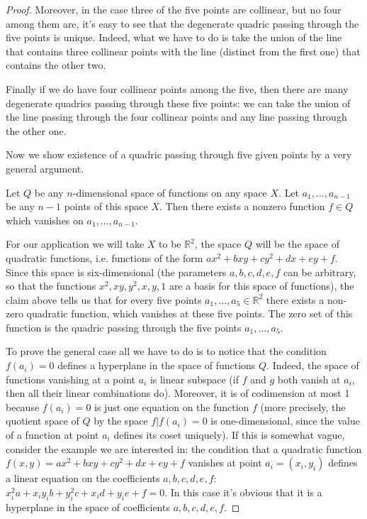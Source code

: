 {{\begin{proof}
Moreover, in the case three of the five points are collinear, but no four among them are, it's easy to see that the degenerate quadric passing through the five points is unique. Indeed, what we have to do is take the union of the line that contains three collinear points with the line (distinct from the first one) that contains the other two.

Finally if we do have four collinear points among the five, then there are many degenerate quadrics passing through these five points: we can take the union of the line passing through the four collinear points and any line passing through the other one.

Now we show existence of a quadric passing through five given points by a very general argument.

Let $Q$ be any $n$-dimensional space of functions on any space $X$. Let $a_1,\ldots,a_{n-1}$ be any $n-1$ points of this space $X$. Then there exists a nonzero function $f\in Q$ which vanishes on $a_1,\ldots,a_{n-1}$.

For our application we will take $X$ to be $\mathbb{R}^2$, the space $Q$ will be the space of quadratic functions, i.e. functions of the form $a x^2+b xy + cy^2+dx+ey+f$. Since this space is six-dimensional (the parameters $a,b,c,d,e,f$ can be arbitrary, so that the functions $x^2,xy,y^2,x,y,1$ are a basis for this space of functions), the claim above tells us that for every five points $a_1,\ldots,a_5\in \mathbb{R}^2$ there exists a non-zero quadratic function, which vanishes at these five points. The zero set of this function is the quadric passing through the five points $a_1,\ldots,a_5$.

To prove the general case all we have to do is to notice that the condition $f(a_i)=0$ defines a hyperplane in the space of functions $Q$. Indeed, the space of functions vanishing at a point $a_i$ is linear subspace (if $f$ and $g$ both vanish at $a_i$, then all their linear combinations do). Moreover, it is of codimension at most 1 because $f(a_i)=0$ is just one equation on the function $f$ (more precisely, the quotient space of $Q$ by the space $f| f(a_i)=0$ is one-dimensional, since the value of a function at point $a_i$ defines its coset uniquely). If this is somewhat vague, consider the example we are interested in: the condition that a quadratic function $f(x,y)=ax^2+bxy+cy^2+dx+ey+f$ vanishes at point $a_i=(x_i,y_i)$ defines a linear equation on the coefficients $a,b,c,d,e,f$: $x_i^2 a + x_iy_i b + y_i^2 c + x_i d + y_i e + f=0$. In this case it's obvious that it is a hyperplane in the space of coefficients $a,b,c,d,e,f$.


\end{proof}}}
